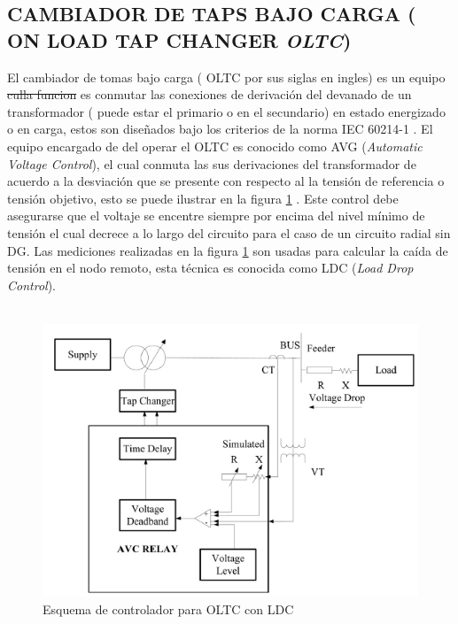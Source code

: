 \documentclass[12pt, letterpaper]{report}
\providecommand{\DIFaddtex}[1]{{\protect\color{blue}\uwave{#1}}} %
\providecommand{\DIFdeltex}[1]{{\protect\color{red}\sout{#1}}}                      %
\providecommand{\DIFaddbegin}{} %
\providecommand{\DIFaddend}{} %
\providecommand{\DIFdelbegin}{} %
\providecommand{\DIFdelend}{} %
\providecommand{\DIFadd}[1]{\texorpdfstring{\DIFaddtex{#1}}{#1}} %
\providecommand{\DIFdel}[1]{\texorpdfstring{\DIFdeltex{#1}}{}} %
\begin{document}
 \subsection{CAMBIADOR DE TAPS BAJO CARGA ( ON LOAD TAP CHANGER \textit{OLTC})}
El cambiador de tomas bajo carga ( OLTC por sus siglas en ingles) es un equipo  \DIFdelbegin \DIFdel{culla funcion }\DIFdelend \DIFaddbegin \DIFadd{cuya función }\DIFaddend es conmutar las conexiones de derivación del devanado de un transformador ( puede estar el primario o en el secundario) en estado energizado o en carga, estos son diseñados bajo los criterios de la norma IEC 60214-1 \cite{IEC60214}.
El equipo encargado de del operar el OLTC es conocido como AVG (\textit{Automatic Voltage Control}), el cual conmuta las sus derivaciones del transformador de acuerdo a la desviación que se presente con respecto al la tensión de referencia o tensión objetivo, esto se puede ilustrar en la figura \ref{fig:esqusema_LDC} \cite{Sarimuthu2016}. Este control debe asegurarse que el voltaje se encentre siempre por encima del nivel mínimo de tensión el cual decrece a lo largo del circuito \cite{Sarimuthu2016} para el caso de un circuito radial sin DG. Las  mediciones realizadas en la figura \ref{fig:esqusema_LDC} son usadas para calcular la caída de tensión en el nodo remoto, esta técnica es conocida como LDC (\textit{Load Drop Control}).\\\\

\begin{figure}[h]
\centering
\caption{Esquema de controlador para OLTC con LDC \cite{Sarimuthu2016}}
\label{fig:esqusema_LDC}
\includegraphics[width=0.7\linewidth]{imagenes/cap_2/LDC}
\end{figure}
\end{document}
